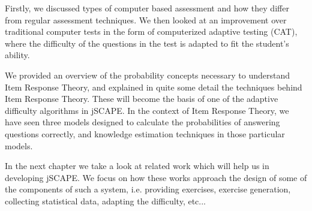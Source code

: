 Firstly, we discussed types of computer based assessment and how they differ from regular assessment techniques. We then looked at an improvement over traditional computer tests in the form of computerized adaptive testing (CAT), where the difficulty of the questions in the test is adapted to fit the student's ability. \newline

We provided an overview of the probability concepts necessary to understand Item Response Theory, and explained in quite some detail the techniques behind Item Response Theory. These will become the basis of one of the adaptive difficulty algorithms in jSCAPE. In the context of Item Response Theory, we have seen three models designed to calculate the probabilities of answering questions correctly, and knowledge estimation techniques in those particular models.\newline

In the next chapter we take a look at related work which will help us in developing jSCAPE. We focus on how these works approach the design of some of the components of such a system, i.e. providing exercises, exercise generation, collecting statistical data, adapting the difficulty, etc...